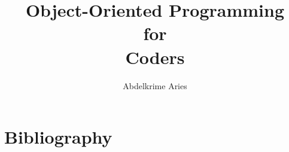 \documentclass{KodeBook}
\title{Object-Oriented Programming\\ for\\ Coders}
\author{Abdelkrime Aries}
\begin{document}
\maketitle

















%


\chapter*{Bibliography}

%
\end{document}
